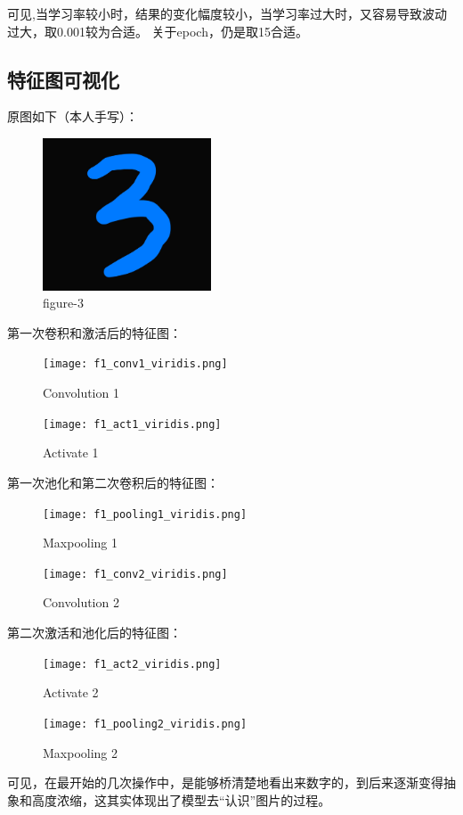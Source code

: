 \documentclass[12pt, a4paper, oneside]{ctexart}
\begin{document}
可见,当学习率较小时，结果的变化幅度较小，当学习率过大时，又容易导致波动过大，取0.001较为合适。
关于epoch，仍是取15合适。

\subsection{特征图可视化}
原图如下（本人手写）：
\begin{figure}[H]
    \centering
    \includegraphics[width=5cm]{test_3.jpg}
    \caption{figure-3}
\end{figure}
第一次卷积和激活后的特征图：
\begin{figure}[H]  
    \begin{minipage}[H]{0.5\linewidth} %
            \centering
            \texttt{[image: f1\_conv1\_viridis.png]}
            \caption{Convolution 1}
     \end{minipage}
     \begin{minipage}[H]{0.5\linewidth} %
         \hspace{2mm}%
         \texttt{[image: f1\_act1\_viridis.png]}
         \caption{Activate 1}
      \end{minipage}
\end{figure}
第一次池化和第二次卷积后的特征图：
\begin{figure}[H]  
    \begin{minipage}[H]{0.5\linewidth} %
            \centering
            \texttt{[image: f1\_pooling1\_viridis.png]}
            \caption{Maxpooling 1}
     \end{minipage}
     \begin{minipage}[H]{0.5\linewidth} %
         \hspace{2mm}%
         \texttt{[image: f1\_conv2\_viridis.png]}
         \caption{Convolution 2}
      \end{minipage}
\end{figure}
第二次激活和池化后的特征图：
\begin{figure}[H]  
    \begin{minipage}[H]{0.5\linewidth} %
            \centering
            \texttt{[image: f1\_act2\_viridis.png]}
            \caption{Activate 2}
     \end{minipage}
     \begin{minipage}[H]{0.5\linewidth} %
         \hspace{2mm}%
         \texttt{[image: f1\_pooling2\_viridis.png]}
         \caption{Maxpooling 2}
      \end{minipage}
\end{figure}
可见，在最开始的几次操作中，是能够桥清楚地看出来数字的，到后来逐渐变得抽象和高度浓缩，这其实体现出了模型去“认识”图片的过程。
\end{document}
